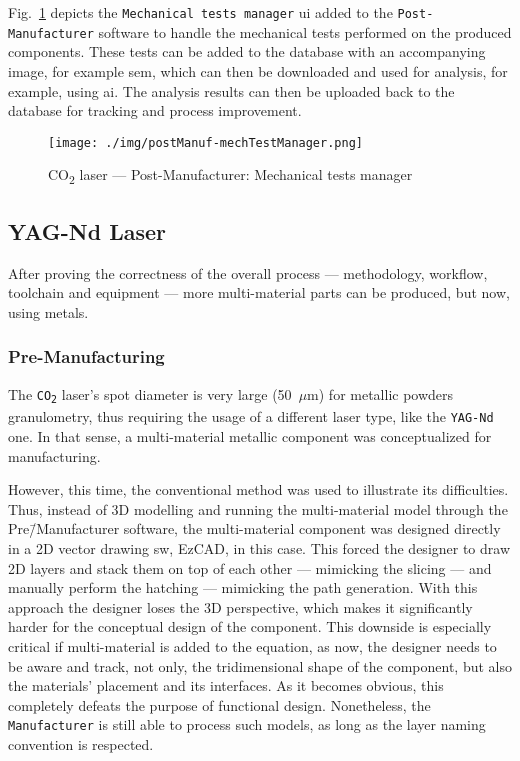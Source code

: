 Fig.~\ref{fig:postManuf-mechTestManager} depicts the \texttt{Mechanical tests
  manager} \gls{ui} added to the \texttt{Post-Manufacturer} software to handle
the mechanical tests performed on the produced components. These tests can be
added to the database with an accompanying image, for example \gls{sem}, which
can then be downloaded and used for analysis, for example, using \gls{ai}. The analysis results can then be uploaded back to the database for
tracking and process improvement.
\begin{figure}[hbtp!]
  \centering
    \texttt{[image: ./img/postManuf-mechTestManager.png]}
  \caption{CO\textsubscript{2} laser --- Post-Manufacturer: Mechanical tests manager}%
  \label{fig:postManuf-mechTestManager}
\end{figure}


\subsection{YAG-Nd Laser}%
\label{sec:yag-nd-laser-test}
After proving the correctness of the overall process --- methodology, workflow,
toolchain and equipment --- more multi-material parts can be produced, but now,
using metals.

\subsubsection{Pre-Manufacturing}%
\label{sec:pre-manufacturing-yag}
The \texttt{CO\textsubscript{2}} laser's
spot diameter is very large (50~$\mu$m) for metallic powders granulometry, thus
requiring the usage of a different laser type, like the \texttt{YAG-Nd} one.
In that sense, a multi-material metallic component was conceptualized for
manufacturing.

However, this time, the conventional method was used to illustrate its
difficulties. Thus, instead of 3D modelling and running the multi-material model
through the Pre\=/Manufacturer software, the multi-material component was
designed directly in a 2D vector drawing \gls{sw}, EzCAD, in this case.
This forced the designer to draw 2D layers and stack them on top of each other
--- mimicking the slicing --- and manually perform the hatching --- mimicking
the path generation.
With this approach the designer loses the 3D perspective, which makes it significantly harder for the
conceptual design of the component. This downside is especially critical if
multi-material is added to the equation, as now, the designer needs to be aware
and track, not only, the tridimensional shape of the component, but also the
materials' placement and its interfaces.
As it becomes obvious, this completely defeats the purpose of functional design.
Nonetheless, the \texttt{Manufacturer} is still able to process such models, as
long as the layer naming convention is respected. 


